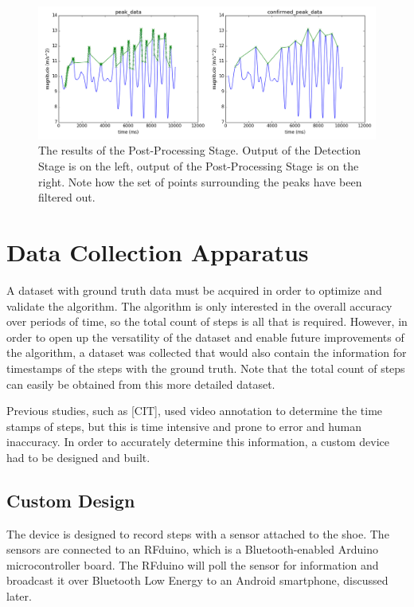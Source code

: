             \begin{figure}[!th]
                \includegraphics[width=\textwidth]{Images/post_stage.png}
                \centering
                \caption{The results of the Post-Processing Stage. Output of the Detection Stage is on the left, output of the Post-Processing Stage is on the right. Note how the set of points surrounding the peaks have been filtered out.}
                \label{img_post_stage}
            \end{figure}

    \chapter{Data Collection Apparatus}

        A dataset with ground truth data must be acquired in order to optimize and validate the algorithm. The algorithm is only interested in the overall accuracy over periods of time, so the total count of steps is all that is required. However, in order to open up the versatility of the dataset and enable future improvements of the algorithm, a dataset was collected that would also contain the information for timestamps of the steps with the ground truth. Note that the total count of steps can easily be obtained from this more detailed dataset. 

        Previous studies, such as [CIT], used video annotation to determine the time stamps of steps, but this is time intensive and prone to error and human inaccuracy. In order to accurately determine this information, a custom device had to be designed and built.

        \section{Custom Design}

            The device is designed to record steps with a sensor attached to the shoe. The sensors are connected to an RFduino, which is a Bluetooth-enabled Arduino microcontroller board. The RFduino will poll the sensor for information and broadcast it over Bluetooth Low Energy to an Android smartphone, discussed later. 

